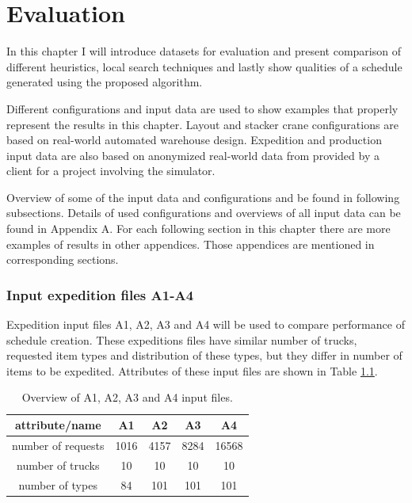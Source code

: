 \documentclass{ctuthesis}
\begin{document}
\chapter{Evaluation}
\label{ch:Evaluation}

In this chapter I will introduce datasets for evaluation and present comparison of different heuristics, local search techniques and lastly show qualities of a schedule generated using the proposed algorithm.

Different configurations and input data are used to show examples that properly represent the results in this chapter. Layout and stacker crane configurations are based on real-world automated warehouse design. Expedition and production input data are also based on anonymized real-world data from provided by a client for a project involving the simulator.

Overview of some of the input data and configurations and be found in following subsections. Details of used configurations and overviews of all input data can be found in Appendix A. For each following section in this chapter there are more examples of results in other appendices. Those appendices are mentioned in corresponding sections.


\subsection{Input expedition files A1-A4}
\label{subsec:dataA}

Expedition input files A1, A2, A3 and A4 will be used to compare performance of schedule creation. These expeditions files have similar number of trucks, requested item types and distribution of these types, but they differ in number of items to be expedited. Attributes of these input files are shown in Table \ref{tab:in1}.

\begin{table}[H]
\begin{tabular}{ |c| c c c c|} 
\hline
attribute/name & A1 & A2 & A3 & A4\\ 
\hline
number of requests & 1016 & 4157 & 8284 & 16568 \\
\hline
number of trucks & 10 & 10 & 10 & 10 \\ 
\hline
number of types & 84 & 101 & 101 & 101 \\ 
\hline
\end{tabular}
\caption{Overview of A1, A2, A3 and A4 input files.} \label{tab:in1}
\end{table}
\end{document}
